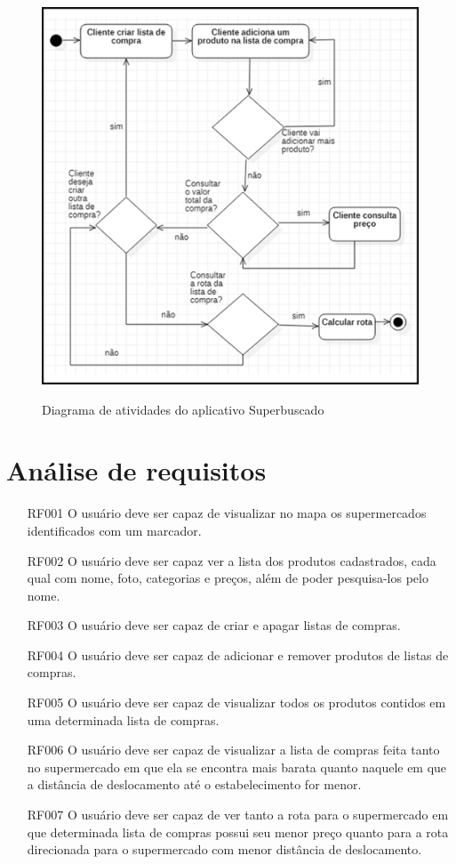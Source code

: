 \begin{figure}[H]
	\centering
		\caption{Diagrama de atividades do aplicativo Superbuscado}
		\includegraphics[scale=0.3]{Imagens/fluxograma.PNG}
		\label{fig:fluxograma}	
\end{figure}

\section{Análise de requisitos}
\begin{itemize}
\item [RF001] O usuário deve ser capaz de visualizar no mapa os supermercados identificados com um marcador.
\item [RF002] O usuário deve ser capaz ver a lista dos produtos cadastrados, cada qual com nome, foto, categorias e preços, além de poder pesquisa-los pelo nome.
\item [RF003] O usuário deve ser capaz de criar e apagar listas de compras.
\item [RF004] O usuário deve ser capaz de adicionar e remover produtos de listas de compras.
\item [RF005] O usuário deve ser capaz de visualizar todos os produtos contidos em uma determinada lista de compras.
\item [RF006] O usuário deve ser capaz de visualizar a lista de compras feita tanto no supermercado em que ela se encontra mais barata quanto naquele em que a distância de deslocamento até o estabelecimento for menor.
\item [RF007] O usuário deve ser capaz de ver tanto a rota para o supermercado em que determinada lista de compras possui seu menor preço quanto para a rota direcionada para o supermercado com menor distância de deslocamento.
\end{itemize}

